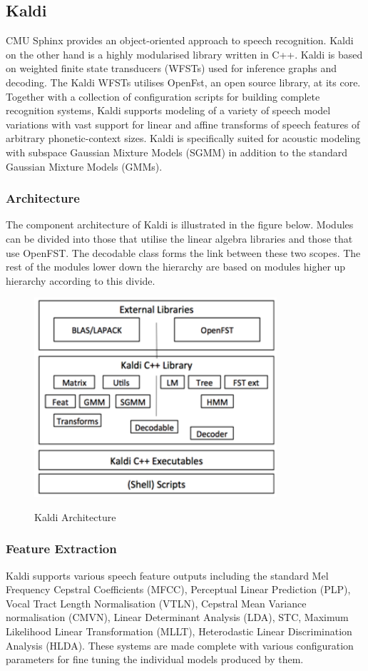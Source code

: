 \subsection{Kaldi}
CMU Sphinx provides an object-oriented approach to speech recognition. Kaldi \cite{povey2011kaldi} on the other hand is a highly modularised library written in C++. Kaldi is based on weighted finite state transducers (WFSTs) used for inference graphs and decoding. The Kaldi WFSTs utilises OpenFst, an open source library, at its core. Together with a collection of configuration scripts for building complete recognition systems, Kaldi supports modeling of a variety of speech model variations with vast support for linear and affine transforms of speech features of arbitrary phonetic-context sizes.  Kaldi is specifically suited for acoustic modeling with subspace Gaussian Mixture Models (SGMM) in addition to the standard Gaussian Mixture Models (GMMs).
\subsubsection{Architecture}
The component architecture of Kaldi is illustrated in the figure below.  Modules can be divided into those that utilise the linear algebra libraries and those that use OpenFST.  The decodable class forms the link between these two scopes.  The rest of the modules lower down the hierarchy are based on modules higher up hierarchy according to this divide.
\begin{figure}
\centering
  \includegraphics[width=9cm]{thesis/images/kaldi}\\
  \caption{Kaldi Architecture\citep{povey2011kaldi}}\label{fig_c3_kaldi}
\end{figure}
\subsubsection{Feature Extraction}
Kaldi supports various speech feature outputs including the standard Mel Frequency Cepstral Coefficients (MFCC), Perceptual Linear Prediction (PLP), Vocal Tract Length Normalisation (VTLN), Cepstral Mean Variance normalisation (CMVN), Linear Determinant Analysis (LDA), STC, Maximum Likelihood Linear Transformation (MLLT), Heterodastic Linear Discrimination Analysis (HLDA).  These systems are made complete with various configuration parameters for fine tuning the individual models produced by them.
